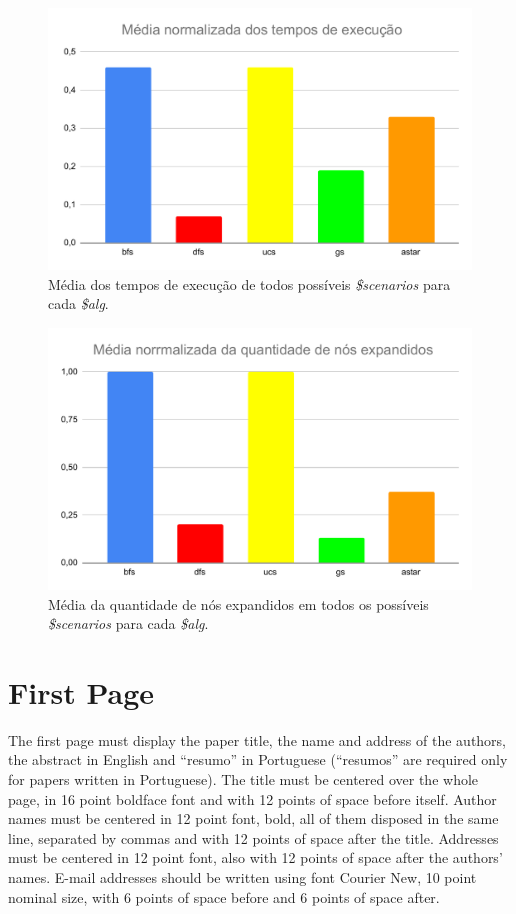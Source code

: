 \documentclass[12pt]{article}
\begin{document}
\begin{figure}[hbt!]
  \centering
  \includegraphics[width=.8\textwidth]{fig/tempo.pdf}
  \caption{Média dos tempos de execução de todos possíveis \textit{\$scenarios} para cada \textit{\$alg}.}
  \label{fig:tempo}
\end{figure}

\begin{figure}[hbt!]
  \centering
  \includegraphics[width=.8\textwidth]{fig/expansao.pdf}
  \caption{Média da quantidade de nós expandidos em todos os possíveis \textit{\$scenarios} para cada \textit{\$alg}.}
  \label{fig:expansao}
\end{figure}


\section{First Page} \label{sec:firstpage}

The first page must display the paper title, the name and address of the
authors, the abstract in English and ``resumo'' in Portuguese (``resumos'' are
required only for papers written in Portuguese). The title must be centered
over the whole page, in 16 point boldface font and with 12 points of space
before itself. Author names must be centered in 12 point font, bold, all of
them disposed in the same line, separated by commas and with 12 points of
space after the title. Addresses must be centered in 12 point font, also with
12 points of space after the authors' names. E-mail addresses should be
written using font Courier New, 10 point nominal size, with 6 points of space
before and 6 points of space after.
\end{document}
